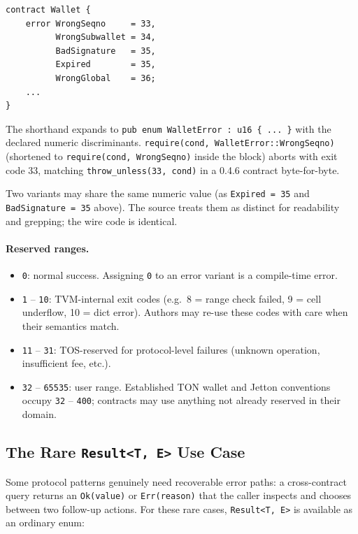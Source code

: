 \documentclass[12pt,oneside]{article}
\begin{document}
\begin{verbatim}
contract Wallet {
    error WrongSeqno     = 33,
          WrongSubwallet = 34,
          BadSignature   = 35,
          Expired        = 35,
          WrongGlobal    = 36;
    ...
}
\end{verbatim}

The shorthand expands to \verb|pub enum WalletError : u16 { ... }|
with the declared numeric discriminants.
\verb|require(cond, WalletError::WrongSeqno)|
(shortened to \verb|require(cond, WrongSeqno)| inside the block)
aborts with exit code 33, matching \verb|throw_unless(33, cond)| in a
0.4.6 contract byte-for-byte.

Two variants may share the same numeric value (as \verb|Expired = 35|
and \verb|BadSignature = 35| above). The source treats them as
distinct for readability and grepping; the wire code is identical.

\paragraph{Reserved ranges.}

\begin{itemize}
\item \verb|0|: normal success. Assigning \verb|0| to an error variant
is a compile-time error.
\item \verb|1| -- \verb|10|: TVM-internal exit codes (e.g.\ 8 = range
check failed, 9 = cell underflow, 10 = dict error). Authors may
re-use these codes with care when their semantics match.
\item \verb|11| -- \verb|31|: TOS-reserved for protocol-level failures
(unknown operation, insufficient fee, etc.).
\item \verb|32| -- \verb|65535|: user range. Established TON wallet
and Jetton conventions occupy \verb|32| -- \verb|400|; contracts may
use anything not already reserved in their domain.
\end{itemize}

\subsection{The Rare \texttt{Result<T, E>} Use Case}
Some protocol patterns genuinely need recoverable error paths: a
cross-contract query returns an \verb|Ok(value)| or \verb|Err(reason)|
that the caller inspects and chooses between two follow-up actions.
For these rare cases, \verb|Result<T, E>| is available as an ordinary
enum:
\end{document}
